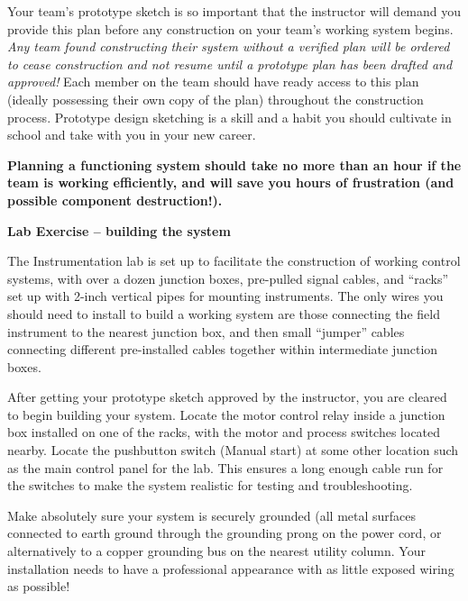 \vskip 10pt

Your team's prototype sketch is so important that the instructor will demand you provide this plan before any construction on your team's working system begins.  {\it Any team found constructing their system without a verified plan will be ordered to cease construction and not resume until a prototype plan has been drafted and approved!}  Each member on the team should have ready access to this plan (ideally possessing their own copy of the plan) throughout the construction process.  Prototype design sketching is a skill and a habit you should cultivate in school and take with you in your new career.

\vskip 10pt

{\bf Planning a functioning system should take no more than an hour if the team is working efficiently, and will save you hours of frustration (and possible component destruction!).}









\vfil \eject

\noindent
{\bf Lab Exercise -- building the system}

\vskip 5pt

The Instrumentation lab is set up to facilitate the construction of working control systems, with over a dozen junction boxes, pre-pulled signal cables, and ``racks'' set up with 2-inch vertical pipes for mounting instruments.  The only wires you should need to install to build a working system are those connecting the field instrument to the nearest junction box, and then small ``jumper'' cables connecting different pre-installed cables together within intermediate junction boxes.

After getting your prototype sketch approved by the instructor, you are cleared to begin building your system.  Locate the motor control relay inside a junction box installed on one of the racks, with the motor and process switches located nearby.  Locate the pushbutton switch (Manual start) at some other location such as the main control panel for the lab.  This ensures a long enough cable run for the switches to make the system realistic for testing and troubleshooting.  

Make absolutely sure your system is securely grounded (all metal surfaces connected to earth ground through the grounding prong on the power cord, or alternatively to a copper grounding bus on the nearest utility column.  Your installation needs to have a professional appearance with as little exposed wiring as possible!

